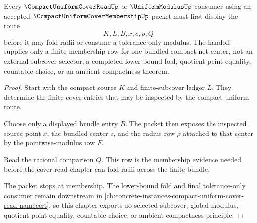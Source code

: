 \begin{theorem}
\label{thm:compact-uniform-cover-membership-cover-read-handoff}
Every $\CompactUniformCoverReadUp$ or $\UniformModulusUp$ consumer using an accepted $\CompactUniformCoverMembershipUp$ packet must first display the route
$$
K,L,B,x,c,\rho,Q
$$
before it may fold radii or consume a tolerance-only modulus. The handoff supplies only a finite membership row for one bundled compact-net center, not an external subcover selector, a completed lower-bound fold, quotient point equality, countable choice, or an ambient compactness theorem.
\end{theorem}
\begin{proof}
Start with the compact source $K$ and finite-subcover ledger $L$. They determine the finite cover entries that may be inspected by the compact-uniform route.

Choose only a displayed bundle entry $B$. The packet then exposes the inspected source point $x$, the bundled center $c$, and the radius row $\rho$ attached to that center by the pointwise-modulus row $F$.

Read the rational comparison $Q$. This row is the membership evidence needed before the cover-read chapter can fold radii across the finite bundle.

The packet stops at membership. The lower-bound fold and final tolerance-only consumer remain downstream in \autoref{ch:concrete-instances-compact-uniform-cover-read-namecert}, so this chapter exports no selected subcover, global modulus, quotient point equality, countable choice, or ambient compactness principle.
\end{proof}


\begin{closurestatus}{\CompactUniformCoverMembershipUp}
  \theoryclosure{\seedClosure}
  \formalstatus{\unformalizedV}
\end{closurestatus}
